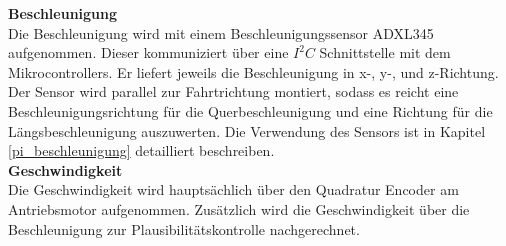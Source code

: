\documentclass[../../main.tex]{subfiles}
\begin{document}
    \textbf{Beschleunigung}\\
    Die Beschleunigung wird mit einem Beschleunigungssensor ADXL345 aufgenommen. Dieser kommuniziert über eine $I^2C$ Schnittstelle mit dem Mikrocontrollers. Er liefert jeweils die Beschleunigung in x-, y-, und z-Richtung. Der Sensor wird parallel zur Fahrtrichtung montiert, sodass es reicht eine Beschleunigungsrichtung für die Querbeschleunigung und eine Richtung für die Längsbeschleunigung auszuwerten. Die Verwendung des Sensors ist in Kapitel \ref{pi_beschleunigung} detailliert beschreiben.\\

    \textbf{Geschwindigkeit}\\
    Die Geschwindigkeit wird hauptsächlich über den Quadratur Encoder am Antriebsmotor aufgenommen. Zusätzlich wird die Geschwindigkeit über die Beschleunigung zur Plausibilitätskontrolle nachgerechnet.
\end{document}
